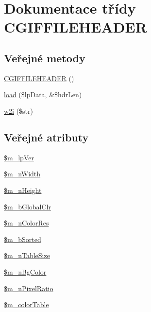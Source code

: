 \hypertarget{class_c_g_i_f_f_i_l_e_h_e_a_d_e_r}{\section{Dokumentace třídy C\-G\-I\-F\-F\-I\-L\-E\-H\-E\-A\-D\-E\-R}
\label{class_c_g_i_f_f_i_l_e_h_e_a_d_e_r}
}
\subsection*{Veřejné metody}
\begin{DoxyCompactItemize}
\item 
\hyperlink{class_c_g_i_f_f_i_l_e_h_e_a_d_e_r_ad69767707b1098a2365a007635f3d92d}{C\-G\-I\-F\-F\-I\-L\-E\-H\-E\-A\-D\-E\-R} ()
\item 
\hyperlink{class_c_g_i_f_f_i_l_e_h_e_a_d_e_r_aad58cceeab96758770a69c2106decc5e}{load} (\$lp\-Data, \&\$hdr\-Len)
\item 
\hyperlink{class_c_g_i_f_f_i_l_e_h_e_a_d_e_r_a08b07ee5864e6aed32ee6a81412db475}{w2i} (\$str)
\end{DoxyCompactItemize}
\subsection*{Veřejné atributy}
\begin{DoxyCompactItemize}
\item 
\hyperlink{class_c_g_i_f_f_i_l_e_h_e_a_d_e_r_a7c6cf88bf099e8c6d038e6e394b64222}{\$m\-\_\-lp\-Ver}
\item 
\hyperlink{class_c_g_i_f_f_i_l_e_h_e_a_d_e_r_a45a9480bb362700a57ea75dd1edfcd3f}{\$m\-\_\-n\-Width}
\item 
\hyperlink{class_c_g_i_f_f_i_l_e_h_e_a_d_e_r_a53585e272ca497534b2938f4f806c494}{\$m\-\_\-n\-Height}
\item 
\hyperlink{class_c_g_i_f_f_i_l_e_h_e_a_d_e_r_aa5c9c12a80f129729f1fb517384fd6df}{\$m\-\_\-b\-Global\-Clr}
\item 
\hyperlink{class_c_g_i_f_f_i_l_e_h_e_a_d_e_r_a5336a03895446bf17b884e7617bd855d}{\$m\-\_\-n\-Color\-Res}
\item 
\hyperlink{class_c_g_i_f_f_i_l_e_h_e_a_d_e_r_afb1f54fd74ebeec8a66b67da0634b3cd}{\$m\-\_\-b\-Sorted}
\item 
\hyperlink{class_c_g_i_f_f_i_l_e_h_e_a_d_e_r_a1a99907a6f773e7238333fa60bbe3d18}{\$m\-\_\-n\-Table\-Size}
\item 
\hyperlink{class_c_g_i_f_f_i_l_e_h_e_a_d_e_r_a8aca427894a908f1701c0ae5853538fe}{\$m\-\_\-n\-Bg\-Color}
\item 
\hyperlink{class_c_g_i_f_f_i_l_e_h_e_a_d_e_r_afaa919c5fd98d0b455a91f167c61ac0a}{\$m\-\_\-n\-Pixel\-Ratio}
\item 
\hyperlink{class_c_g_i_f_f_i_l_e_h_e_a_d_e_r_a2f20165667d814c639876c8088438ea2}{\$m\-\_\-color\-Table}
\end{DoxyCompactItemize}


